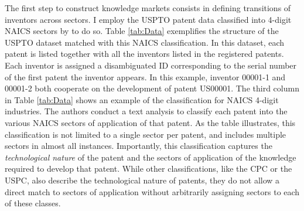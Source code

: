 The first step to construct knowledge markets consists in defining
transitions of inventors across sectors. I employ the USPTO patent
data classified into 4-digit NAICS sectors by \citet{goldschlagAlgorithmicLinksProbabilities2016}
to do so. Table \ref{tab:Data} exemplifies the structure of the USPTO
dataset matched with this NAICS classification. In this dataset, each
patent is listed together with all the inventors listed in the registered
patents. Each inventor is assigned a disambiguated ID corresponding
to the serial number of the first patent the inventor appears. In
this example, inventor 00001-1 and 00001-2 both cooperate on the development
of patent US00001. The third column in Table \ref{tab:Data} shows
an example of the \citet{goldschlagAlgorithmicLinksProbabilities2016}
classification for NAICS 4-digit industries. The authors conduct a
text analysis to classify each patent into the various NAICS sectors
of application of that patent. As the table illustrates, this classification
is not limited to a single sector per patent, and includes multiple
sectors in almost all instances. Importantly, this classification
captures the \emph{technological nature} of the patent and the sectors
of application of the knowledge required to develop that patent. While
other classifications, like the CPC or the USPC, also describe the
technological nature of patents, they do not allow a direct match
to sectors of application without arbitrarily assigning sectors to
each of these classes.

